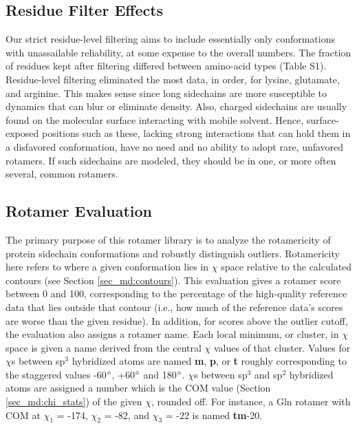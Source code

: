 \subsection{Residue Filter Effects}
\label{sec_rs:filterdataset}
Our strict residue-level filtering aims to include essentially only conformations with unassailable reliability, at some expense to the overall numbers. The fraction of  residues kept after filtering differed between amino-acid types (Table S1). Residue-level filtering eliminated the most data, in order, for lysine, glutamate, and arginine. This makes sense since long sidechains are more susceptible to dynamics that can blur or eliminate density. Also, charged sidechains are usually found on the molecular surface interacting with mobile solvent. Hence, surface-exposed positions such as these, lacking strong interactions that can hold them in a disfavored conformation, have no need and no ability to adopt rare, unfavored rotamers. If such sidechains are modeled, they should be in one, or more often several, common rotamers.

\subsection{Rotamer Evaluation}
\label{sec_rs:rotaeval}
The primary purpose of this rotamer library is to analyze the rotamericity of protein sidechain conformations and robustly distinguish outliers. Rotamericity here refers to where a given conformation lies in $\chi$ space relative to the calculated contours (see Section \ref{sec_md:contours}). This evaluation gives a rotamer score between 0 and 100, corresponding to the percentage of the high-quality reference data that lies outside that contour (i.e., how much of the reference data's scores are worse than the given residue). In addition, for scores above the outlier cutoff, the evaluation also assigns a rotamer name. Each local minimum, or cluster, in $\chi$ space is given a name derived from the central $\chi$ values of that cluster. Values for $\chi$s between sp$^{3}$ hybridized atoms are named \textbf{m}, \textbf{p}, or \textbf{t} roughly corresponding to the staggered values -60$\degree$, +60$\degree$ and 180$\degree$. $\chi$s between sp$^{3}$ and sp$^{2}$ hybridized atoms are assigned a number which is the COM value (Section \ref{sec_md:chi_stats}) of the given $\chi$, rounded off. For instance, a Gln rotamer with COM at $\chi_1$ = -174, $\chi_2$ = -82, and $\chi_3$ = -22 is named \textbf{tm}-20.

